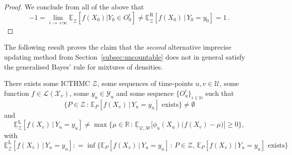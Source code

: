 \documentclass[twoside,11pt]{article}
\newcommand{\nats}{\mathbb{N}}
\newcommand{\reals}{\mathbb{R}}
\newcommand{\states}{\mathcal{X}}
\newcommand{\observs}{\mathcal{Y}}
\newcommand{\lexp}{\underline{\mathbb{E}}_{\rateset,\mathcal{M}}}
\newcommand{\gambles}{\mathcal{L}}
\newcommand{\rateset}{\mathcal{Q}}
\newcommand{\coloneqq}{:\!=}
\begin{document}
\begin{proof}
We conclude from all of the above that
\begin{equation*}
-1 =  \lim_{i\to+\infty} \underline{\mathbb{E}}_\mathcal{Z}[f(X_0)\vert Y_0\in O_0^i] \neq \underline{\mathbb{E}}_\mathcal{Z}^\mathrm{R}[f(X_0)\,\vert\, Y_0=y_0] = 1\,.
\end{equation*}
\end{proof}

The following result proves the claim that the \emph{second} alternative imprecise updating method from Section~\ref{subsec:uncountable} does not in general satisfy the generalised Bayes' rule for mixtures of densities.
\begin{corollary}
There exists some ICTHMC $\mathcal{Z}$, some sequences of time-points $u,v\in\mathcal{U}$, some function $f\in\gambles(\states_v)$, some $y_u\in\observs_u$ and some sequence $\{O_u^i\}_{i\in\nats}$ such that
\begin{equation*}
\{P\in\mathcal{Z}\,:\,\text{$\mathbb{E}_P[f(X_v)\,\vert\,Y_u=y_u]$ exists}\}\neq\emptyset
\end{equation*}
and
\begin{equation*}
\underline{\mathbb{E}}_\mathcal{Z}^\mathrm{L}[f(X_v)\,\vert\, Y_u=y_u] \neq \max\{\mu\in\reals\,:\,\lexp\bigl[\phi_u(X_u)\bigl(f(X_v)-\mu\bigr)\bigr]\geq 0\},
\end{equation*}
with
\begin{equation*}
\underline{\mathbb{E}}_\mathcal{Z}^\mathrm{L}[f(X_v)\,\vert\, Y_u=y_u]\coloneqq \inf\bigl\{\mathbb{E}_P[f(X_v)\,\vert\,Y_u=y_u]\,:\,P\in\mathcal{Z},\,\text{$\mathbb{E}_P[f(X_v)\,\vert\,Y_u=y_u]$ exists}\bigr\}
\end{equation*}
\end{corollary}
\end{document}
